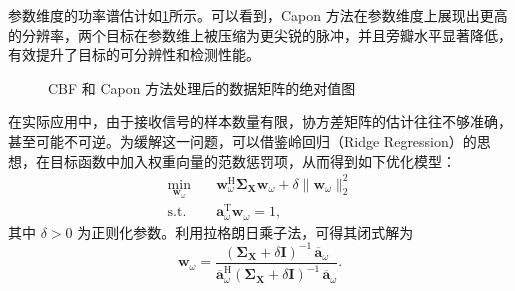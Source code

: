 \begin{solution}
    参数维度的功率谱估计如\cref{fig_compressed}所示。可以看到，Capon 方法在参数维度上展现出更高的分辨率，两个目标在参数维上被压缩为更尖锐的脉冲，并且旁瓣水平显著降低，有效提升了目标的可分辨性和检测性能。
    \begin{figure}[htb!]
        \centering
        \caption{CBF 和 Capon 方法处理后的数据矩阵的绝对值图}
        \label{fig_compressed}
    \end{figure}
\end{solution}


在实际应用中，由于接收信号的样本数量有限，协方差矩阵的估计往往不够准确，甚至可能不可逆。为缓解这一问题，可以借鉴岭回归（Ridge Regression）的思想，在目标函数中加入权重向量的范数惩罚项，从而得到如下优化模型：
\[
    \begin{aligned}
        \min_{\bm{w}_{\omega}} \quad &
        \bm{w}_{\omega}^{\mathrm{H}} \mathbf{\Sigma}_{\mathbf{X}} \bm{w}_{\omega}
        + \delta \|\bm{w}_{\omega}\|_2^2                                                 \\
        \text{s.t.} \quad            & \bm{a}_{\omega}^{\mathrm{T}} \bm{w}_{\omega} = 1,
    \end{aligned}
\]
其中 \(\delta > 0\) 为正则化参数。利用拉格朗日乘子法，可得其闭式解为
\[
    \bm{w}_{\omega}
    = \frac{(\mathbf{\Sigma}_{\mathbf{X}} + \delta \mathbf{I})^{-1} \,\overline{\bm{a}}_{\omega}}
    {\overline{\bm{a}}_{\omega}^{\mathrm{H}} (\mathbf{\Sigma}_{\mathbf{X}} + \delta \mathbf{I})^{-1} \,\overline{\bm{a}}_{\omega}}.
\]


